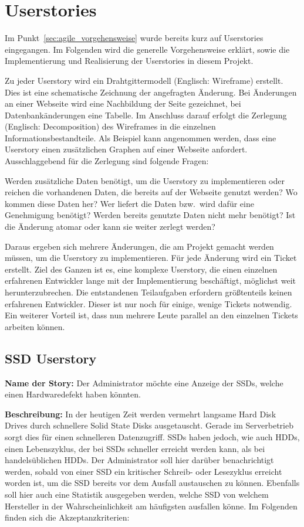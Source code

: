 \chapter{Userstories}
Im Punkt~\ref{sec:agile_vorgehensweise} wurde bereits kurz auf Userstories
eingegangen. Im Folgenden wird die generelle Vorgehensweise erklärt, sowie die
Implementierung und Realisierung der Userstories in diesem Projekt.

Zu jeder Userstory wird ein Drahtgittermodell (Englisch: Wireframe) erstellt.
Dies ist eine schematische Zeichnung der angefragten Änderung. Bei Änderungen
an einer Webseite wird eine Nachbildung der Seite gezeichnet, bei
Datenbankänderungen eine Tabelle. Im Anschluss darauf erfolgt die Zerlegung
(Englisch: Decomposition) des Wireframes in die einzelnen
Informationsbestandteile. Als Beispiel kann angenommen werden, dass eine
Userstory einen zusätzlichen Graphen auf einer Webseite anfordert.
Ausschlaggebend für die Zerlegung sind folgende Fragen:

\begin{outline}
  \1 Werden zusätzliche Daten benötigt, um die Userstory zu implementieren oder
  reichen die vorhandenen Daten, die bereits auf der Webseite genutzt werden?
  \1 Wo kommen diese Daten her?
  \1 Wer liefert die Daten bzw.\ wird dafür eine Genehmigung benötigt?
  \1 Werden bereits genutzte Daten nicht mehr benötigt?
  \1 Ist die Änderung atomar oder kann sie weiter zerlegt werden?
\end{outline}

Daraus ergeben sich mehrere Änderungen, die am Projekt gemacht werden müssen,
um die Userstory zu implementieren. Für jede Änderung wird ein Ticket erstellt.
Ziel des Ganzen ist es, eine komplexe Userstory, die einen einzelnen erfahrenen
Entwickler lange mit der Implementierung beschäftigt, möglichst weit
herunterzubrechen. Die entstandenen Teilaufgaben erfordern größtenteils keinen
erfahrenen Entwickler. Dieser ist nur noch für einige, wenige Tickets
notwendig.  Ein weiterer Vorteil ist, dass nun mehrere Leute parallel an den
einzelnen Tickets arbeiten können.
\tm%

\section{SSD Userstory}
\textbf{Name der Story:} Der Administrator möchte eine Anzeige der SSDs, welche
einen Hardwaredefekt haben könnten.

\textbf{Beschreibung:} In der heutigen Zeit werden vermehrt langsame
Hard Disk Drives durch schnellere Solid State Disks ausgetauscht. Gerade im
Serverbetrieb sorgt dies für einen schnelleren Datenzugriff. SSDs haben
jedoch, wie auch HDDs, einen Lebenszyklus, der bei SSDs schneller erreicht
werden kann, als bei handelsüblichen HDDs. Der Administrator soll hier darüber
benachrichtigt werden, sobald von einer SSD ein kritischer Schreib- oder
Lesezyklus erreicht worden ist, um die SSD bereits vor dem Ausfall austauschen
zu können. Ebenfalls soll hier auch eine Statistik ausgegeben werden, welche
SSD von welchem Hersteller in der Wahrscheinlichkeit am häufigsten ausfallen
könne. Im Folgenden finden sich die Akzeptanzkriterien:

